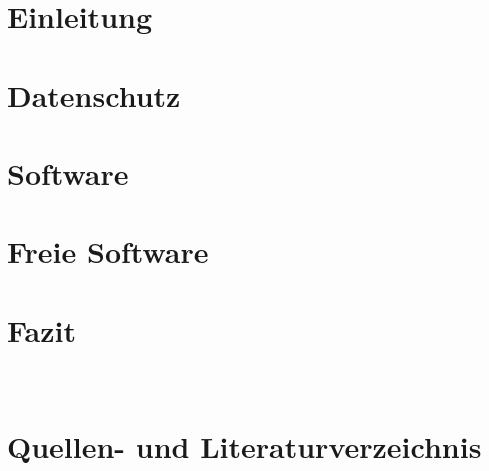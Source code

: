\documentclass[11pt]{article}
\begin{document}

\pagebreak
\tableofcontents
\pagebreak
\section{Einleitung}

\pagebreak
\section{Datenschutz}

\pagebreak
\section{Software}

\pagebreak
\section{Freie Software}

\pagebreak
\section{Fazit}
\\
\pagebreak
%
\section{Quellen- und Literaturverzeichnis}

\pagebreak

\pagebreak
\end{document}
